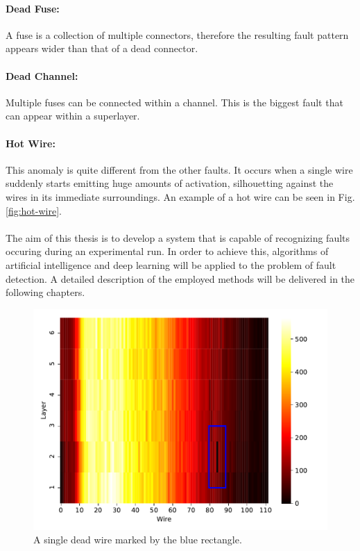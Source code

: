 \paragraph{Dead Fuse:}
A fuse is a collection of multiple
connectors, therefore the resulting fault pattern appears wider
than that of a dead connector.

\paragraph{Dead Channel:}
Multiple fuses can be connected within
a channel. This is the biggest fault that can appear within a
superlayer.

\paragraph{Hot Wire:}
This anomaly is quite different from the other faults. It occurs when
a single wire suddenly starts emitting huge amounts of activation,
silhouetting against the wires in its immediate surroundings. An
example of a hot wire can be seen in Fig. \ref{fig:hot-wire}.
\\
\\
The aim of this thesis is to develop a system that is capable of
recognizing faults occuring during an experimental run. In order to
achieve this, algorithms of artificial intelligence
and deep learning will be applied to the problem of fault detection. A
detailed description of the employed methods will
be delivered in the following chapters.

\begin{figure}[h]
  \centering
  \includegraphics[width=\textwidth]{../figures/dead_wire}
  \caption{A single dead wire marked by the blue rectangle.}
  \label{fig:dead-wire}
\end{figure}

